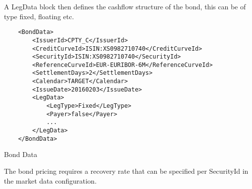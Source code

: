 A LegData block then defines the cashflow structure of the bond, this can be of type fixed, floating etc.

\begin{listing}[H]
\begin{verbatim}
    <BondData>
        <IssuerId>CPTY_C</IssuerId>
        <CreditCurveId>ISIN:XS0982710740</CreditCurveId>
        <SecurityId>ISIN:XS0982710740</SecurityId>
        <ReferenceCurveId>EUR-EURIBOR-6M</ReferenceCurveId>
        <SettlementDays>2</SettlementDays>
        <Calendar>TARGET</Calendar>
        <IssueDate>20160203</IssueDate>
        <LegData>
            <LegType>Fixed</LegType>
            <Payer>false</Payer>
            ...
        </LegData>
    </BondData>
\end{verbatim}
\caption{Bond Data}
\label{lst:bonddata}
\end{listing}

The bond pricing requires a recovery rate that can be specified per SecurityId in the market data configuration.